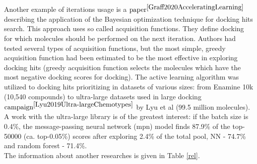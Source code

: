Another example of iterations usage is a $\text{paper}^{\cite{Graff2020AcceleratingLearning}}$ describing the application of the Bayesian optimization technique for docking hits search.
This approach uses so called acquisition functions.
They define docking for which molecules should be performed on the next iteration.
Authors had tested several types of acquisition functions, but the most simple, greedy acquisition function had been estimated to be the most effective in exploring docking hits
(greedy acquisition function selects the molecules which have the most negative docking scores for docking).
The active learning algorithm was utilized to docking hits prioritizing in datasets of various sizes: from Enamine 10k (10,540 compounds) to ultra-large datasets used in large docking $\text{campaign}^{\cite{Lyu2019Ultra-largeChemotypes}}$ by Lyu et al (99.5 million molecules).
A work with the ultra-large library is of the greatest interest: if the batch size is 0.4\%, the message-passing neural network (\acrshort{mpn}) model finds 87.9\% of the top-50000 (ca. top-0.05\%) scores after exploring 2.4\% of the total pool, NN - 74.7\% and random forest - 71.4\%.\\

The information about another researches is given in Table \ref{rel}.

